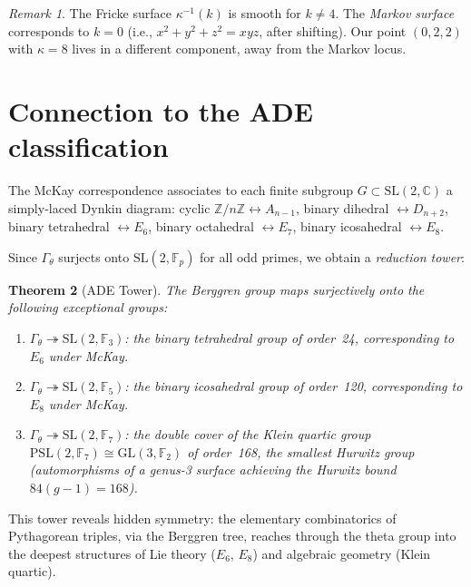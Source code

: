 \documentclass[12pt]{amsart}
\newtheorem{theorem}{Theorem}[section]
\theoremstyle{definition}
\theoremstyle{remark}
\newtheorem{remark}[theorem]{Remark}
\newcommand{\SL}{\mathrm{SL}}
\newcommand{\PSL}{\mathrm{PSL}}
\newcommand{\GL}{\mathrm{GL}}
\newcommand{\Fp}{\mathbb{F}_p}
\newcommand{\Z}{\mathbb{Z}}
\newcommand{\C}{\mathbb{C}}
\begin{document}
\begin{remark}
The Fricke surface $\kappa^{-1}(k)$ is smooth for $k \ne 4$.
The \emph{Markov surface} corresponds to $k = 0$
(i.e., $x^2+y^2+z^2 = xyz$, after shifting).  Our point $(0,2,2)$
with $\kappa = 8$ lives in a different component, away from the
Markov locus.
\end{remark}

\section{Connection to the ADE classification}\label{sec:ade}

The McKay correspondence associates to each finite subgroup
$G \subset \SL(2,\C)$ a simply-laced Dynkin diagram: cyclic
$\Z/n\Z \leftrightarrow A_{n-1}$, binary dihedral
$\leftrightarrow D_{n+2}$, binary tetrahedral $\leftrightarrow E_6$,
binary octahedral $\leftrightarrow E_7$, binary icosahedral
$\leftrightarrow E_8$.

Since $\Gamma_\theta$ surjects onto $\SL(2,\Fp)$ for all odd primes,
we obtain a \emph{reduction tower}:

\begin{theorem}[ADE Tower]\label{thm:ade}
The Berggren group maps surjectively onto the following exceptional groups:
\begin{enumerate}[label=(\roman*)]
\item $\Gamma_\theta \twoheadrightarrow \SL(2,\mathbb{F}_3)$: the
  \emph{binary tetrahedral group} of order~24, corresponding to
  $E_6$ under McKay.
\item $\Gamma_\theta \twoheadrightarrow \SL(2,\mathbb{F}_5)$: the
  \emph{binary icosahedral group} of order~120, corresponding to
  $E_8$ under McKay.
\item $\Gamma_\theta \twoheadrightarrow \SL(2,\mathbb{F}_7)$: the
  double cover of the \emph{Klein quartic group}
  $\PSL(2,\mathbb{F}_7) \cong \GL(3,\mathbb{F}_2)$ of order~168,
  the smallest Hurwitz group (automorphisms of a genus-3 surface
  achieving the Hurwitz bound $84(g-1) = 168$).
\end{enumerate}
\end{theorem}

This tower reveals hidden symmetry: the elementary combinatorics of
Pythagorean triples, via the Berggren tree, reaches through the theta
group into the deepest structures of Lie theory ($E_6$, $E_8$) and
algebraic geometry (Klein quartic).
\end{document}
